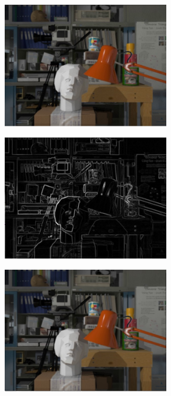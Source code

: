 \begin{figure}[h!]
\centering
\begin{subfigure}[]{0.4\textwidth}
\centering
\includegraphics[width=0.8\textwidth]{./img/wat_left.jpg}
\caption{\label{fig:lw}}
\end{subfigure}
\begin{subfigure}[]{0.4\textwidth}
\centering
\includegraphics[width=0.8\textwidth]{./img/left_sobel.jpg}
\caption{\label{fig:lws}}
\end{subfigure}
\begin{subfigure}[]{0.4\textwidth}
\centering
\includegraphics[width=0.8\textwidth]{./img/right_wat.jpg}

\end{subfigure}
\end{figure}

